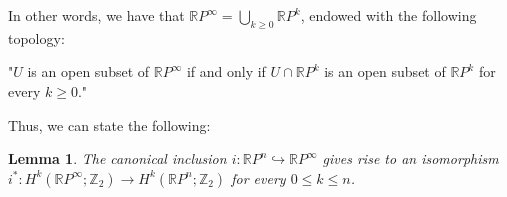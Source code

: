 \documentclass[12pt,oneside]{book}
\newtheorem{lem}    {Lemma}[chapter]
\newcommand{\ds}{\displaystyle}
\newcommand{\RP}{\mathbb{R}P}
\newcommand{\Z}{\mathbb{Z}}
\begin{document}
    In other words, we have that $\RP^{\infty}=\ds\bigcup_{k\geq 0}\RP^{k}$, endowed with the following topology:
    
    \begin{center}
        "$U$ is an open subset of $\RP^{\infty}$ if and only if $U\cap\RP^{k}$ is an open subset of $\RP^{k}$ for every $k\geq 0$."
    \end{center}
    
    Thus, we can state the following:
    
    \begin{lem}\label{iso_proj}
        The canonical inclusion $i:\RP^{n}\hookrightarrow \RP^{\infty}$ gives rise to an isomorphism 
        $i^{*}:H^{k}(\RP^{\infty};\Z_{2})\to H^{k}(\RP^{n};\Z_{2})$ for every $0\leq k\leq n$.
    \end{lem}
    
\end{document}
